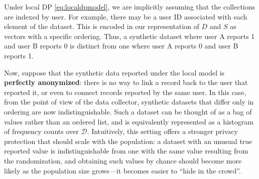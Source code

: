 \documentclass[11pt]{article}
\newcommand{\Dsp}{\mathcal{D}}
\begin{document}
Under local DP \eqref{eq:localdpmodel}, we are implicitly assuming that the collections are indexed by user.
For example, there may be a user ID associated with each element of the dataset.
This is encoded in our representation of $D$ and $S$ as vectors with a specific ordering.
Thus, a synthetic dataset where user A reports 1 and user B reports 0 is distinct from one where user A reports 0 and user B reports 1.


Now, suppose that the synthetic data reported under the local model is \textbf{perfectly anonymized}: there is no way to link a record back to the user that reported it, or even to connect records reported by the same user.
In this case, from the point of view of the data collector, synthetic datasets that differ only in ordering are now indistinguishable.
Such a dataset can be thought of as a bag of values rather than an ordered list, and is equivalently represented as a histogram of frequency counts over $\Dsp$.
Intuitively, this setting offers a stronger privacy protection that should scale with the population: a dataset with an unusual true reported value is indistinguishable from one with the same value resulting from the randomization, and obtaining such values by chance should become more likely as the population size grows---it becomes easier to ``hide in the crowd''.
\end{document}
